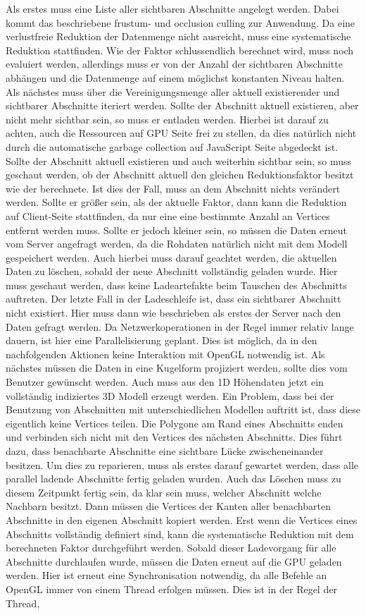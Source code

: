 Als erstes muss eine Liste aller sichtbaren Abschnitte angelegt werden. Dabei kommt das beschriebene frustum- und occlusion culling zur Anwendung. Da eine verlustfreie Reduktion der Datenmenge nicht ausreicht, muss eine systematische Reduktion stattfinden. Wie der Faktor schlussendlich berechnet wird, muss noch evaluiert werden, allerdings muss er von der Anzahl der sichtbaren Abschnitte abhängen und die Datenmenge auf einem möglichst konstanten Niveau halten. Als nächstes muss über die Vereinigungsmenge aller aktuell existierender und sichtbarer Abschnitte iteriert werden. Sollte der Abschnitt aktuell existieren, aber nicht mehr sichtbar sein, so muss er entladen werden. Hierbei ist darauf zu achten, auch die Ressourcen auf GPU Seite frei zu stellen, da dies natürlich nicht durch die automatische garbage collection auf JavaScript Seite abgedeckt ist. Sollte der Abschnitt aktuell existieren und auch weiterhin sichtbar sein, so muss geschaut werden, ob der Abschnitt aktuell den gleichen Reduktionsfaktor besitzt wie der berechnete. Ist dies der Fall, muss an dem Abschnitt nichts verändert werden. Sollte er größer sein, als der aktuelle Faktor, dann kann die Reduktion auf Client-Seite stattfinden, da nur eine eine bestimmte Anzahl an Vertices entfernt werden muss. Sollte er jedoch kleiner sein, so müssen die Daten erneut vom Server angefragt werden, da die Rohdaten natürlich nicht mit dem Modell gespeichert werden. Auch hierbei muss darauf geachtet werden, die aktuellen Daten zu löschen, sobald der neue Abschnitt vollständig geladen wurde. Hier muss geschaut werden, dass keine Ladeartefakte beim Tauschen des Abschnitts auftreten. Der letzte Fall in der Ladeschleife ist, dass ein sichtbarer Abschnitt nicht existiert. Hier muss dann wie beschrieben als erstes der Server nach den Daten gefragt werden. Da Netzwerkoperationen in der Regel immer relativ lange dauern, ist hier eine Parallelisierung geplant. Dies ist möglich, da in den nachfolgenden Aktionen keine Interaktion mit OpenGL notwendig ist. Als nächstes müssen die Daten in eine Kugelform projiziert werden, sollte dies vom Benutzer gewünscht werden. Auch muss aus den 1D Höhendaten jetzt ein vollständig indiziertes 3D Modell erzeugt werden. Ein Problem, dass bei der Benutzung von Abschnitten mit unterschiedlichen Modellen auftritt ist, dass diese eigentlich keine Vertices teilen. Die Polygone am Rand eines Abschnitts enden und verbinden sich nicht mit den Vertices des nächsten Abschnitts. Dies führt dazu, dass benachbarte Abschnitte eine sichtbare Lücke zwischeneinander besitzen. Um dies zu reparieren, muss als erstes darauf gewartet werden, dass alle parallel ladende Abschnitte fertig geladen wurden. Auch das Löschen muss zu diesem Zeitpunkt fertig sein, da klar sein muss, welcher Abschnitt welche Nachbarn besitzt. Dann müssen die Vertices der Kanten aller benachbarten Abschnitte in den eigenen Abschnitt kopiert werden. Erst wenn die Vertices eines Abschnitts vollständig definiert sind, kann die systematische Reduktion mit dem berechneten Faktor durchgeführt werden. Sobald dieser Ladevorgang für alle Abschnitte durchlaufen wurde, müssen die Daten erneut auf die GPU geladen werden. Hier ist erneut eine Synchronisation notwendig, da alle Befehle an OpenGL immer von einem Thread erfolgen müssen. Dies ist in der Regel der Thread, 
